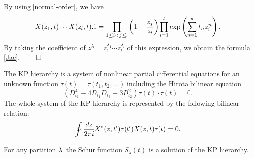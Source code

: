 \quad
By using \eqref{normal-order}, we have
\begin{equation}
X(z_1,t) \cdots X(z_l,t) . 1=
\prod_{1 \leq i < j \leq l} \left(1-{z_j \over z_i} \right)
\prod_{i=1}^{l} \exp \left( \sum_{n=1}^{\infty} t_n z_i^n \right).
\end{equation}
By taking the coefficient of 
$z^{\lambda}=z_1^{\lambda_1}\cdots z_l^{\lambda_l}$
of this expression, we obtain the formula \eqref{Jac}.
$\qed$
\par\medskip
The KP hierarchy is a system of nonlinear partial differential 
equations for an unknown function $\tau(t)=\tau(t_1,t_2,\ldots)$ 
including the Hirota bilinear equation
\begin{equation}
(D_{t_1}^4-4 D_{t_1} D_{t_3}+3 D_{t_2}^2) \tau(t) \cdot \tau(t)=0.
\end{equation}
The whole system of the KP hierarchy is represented by
the following bilinear relation: 
\begin{equation}\label{KPXX}
\oint {dz \over 2 \pi i} 
X^{\ast}(z,t') \tau(t') X(z,t) \tau(t)=0.
\end{equation}
%
\begin{prop}
For any partition $\lambda$, the 
Schur function $S_\lambda(t)$ 
is a solution of the KP hierarchy.
\end{prop}

